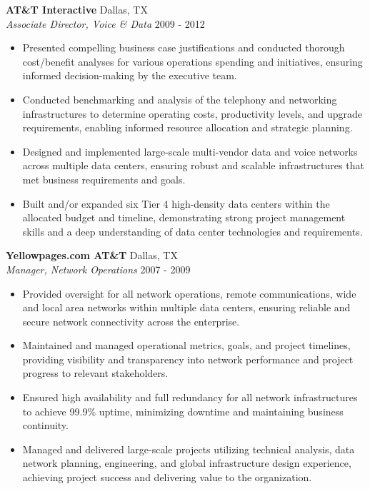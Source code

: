 \documentclass[a4paper]{article}
\begin{document}
\textbf{AT\&T Interactive} \hfill Dallas, TX\\
\textit{Associate Director, Voice \& Data} \hfill 2009 - 2012\\
\vspace{-1mm}
\begin{itemize} \itemsep 1pt
	\item Presented compelling business case justifications and conducted thorough cost/benefit analyses for various operations spending and initiatives, ensuring informed decision-making by the executive team.
	\item Conducted benchmarking and analysis of the telephony and networking infrastructures to determine operating costs, productivity levels, and upgrade requirements, enabling informed resource allocation and strategic planning.
	\item Designed and implemented large-scale multi-vendor data and voice networks across multiple data centers, ensuring robust and scalable infrastructures that met business requirements and goals.
	\item Built and/or expanded six Tier 4 high-density data centers within the allocated budget and timeline, demonstrating strong project management skills and a deep understanding of data center technologies and requirements.
\end{itemize}
\textbf{Yellowpages.com \textbar{} AT\&T} \hfill Dallas, TX\\
\textit{Manager, Network Operations} \hfill 2007 - 2009\\
\vspace{-1mm}
\begin{itemize} \itemsep 1pt
	\item Provided oversight for all network operations, remote communications, wide and local area networks within multiple data centers, ensuring reliable and secure network connectivity across the enterprise.
	\item Maintained and managed operational metrics, goals, and project timelines, providing visibility and transparency into network performance and project progress to relevant stakeholders.
	\item Ensured high availability and full redundancy for all network infrastructures to achieve 99.9\% uptime, minimizing downtime and maintaining business continuity.
	\item Managed and delivered large-scale projects utilizing technical analysis, data network planning, engineering, and global infrastructure design experience, achieving project success and delivering value to the organization.
\end{itemize}
\end{document}
